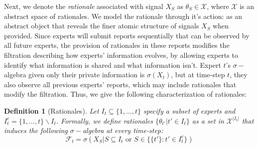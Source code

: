 \documentclass{winnower}
\newtheorem{example}{Example}
\newtheorem{definition}{Definition}
\begin{document}

Next, we denote the \emph{rationale} associated with signal $X_S$ as $\theta_S \in \mathcal{X}$, where $\mathcal{X}$ is an abstract space of rationales. We model the rationale through it's action: as an abstract object that reveals the finer atomic structure of signals $X_S$ when provided. Since experts will submit reports sequentially that can be observed by all future experts, the provision of rationales in these reports modifies the filtration describing how experts' information evolves, by allowing experts to identify what information is shared and what information isn't. Expert $t$'s $\sigma-$algebra given only their private information is $\sigma(X_t)$, but at time-step $t$, they also observe all previous experts' reports, which may include rationales that modify the filtration. Thus, we give the following characterization of rationales:

\begin{definition}[Rationales]
Let $I_t \subseteq \{1, \ldots, t\}$ specify a subset of experts and $I_t^c = \{1, \ldots, t\}\backslash I_t$.  Formally, we define rationales $\{ \theta_{t'} | t' \in I_t\}$ as a set in $\mathcal{X}^{|I_t|}$ that induces the following $\sigma-$algebra at every time-step:
\begin{equation}
    \mathcal{F}_t = \sigma\left(X_S | S \subseteq I_t  \text{ or } S \in \{\{t'\} : t'\in I_t^c\} \right)
\end{equation}
\end{definition}
\end{document}
